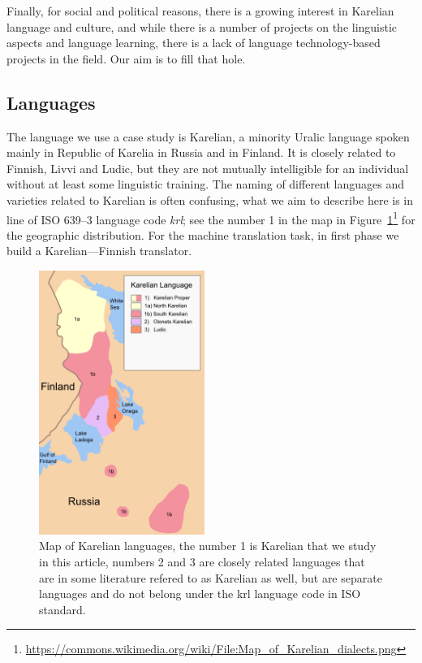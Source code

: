 \documentclass{flammie}
\begin{document}
Finally, for social and political reasons, there is a growing interest in
Karelian language and culture, and while there is a number of projects on
the linguistic aspects and language learning, there is a lack of
language technology-based projects in the field. Our aim is to fill that
hole.


\subsection{Languages}

The language we use a case study is Karelian, a minority Uralic language spoken
mainly in Republic of Karelia in Russia and in Finland. It is closely related
to Finnish, Livvi and Ludic, but they are not mutually intelligible for an
individual without at least some linguistic training. The naming of different
languages and varieties related to Karelian is often confusing, what we aim to
describe here is in line of ISO 639--3 language code \textit{krl}; see the
number 1 in the map in
Figure~\ref{fig:krl-map}\footnote{\url{https://commons.wikimedia.org/wiki/File:Map_of_Karelian_dialects.png}}
for the geographic distribution. For the machine translation task, in first
phase we build a Karelian---Finnish translator.

\begin{figure}
    \includegraphics[width=0.48\textwidth]{Map_of_Karelian_dialects.png}
    \caption{Map of Karelian languages, the number 1 is Karelian that
    we study in this article, numbers 2 and 3 are closely related languages
    that are in some literature refered to as Karelian as well, but are
    separate languages and do not belong under the krl language code in
    ISO standard.\label{fig:krl-map}}
\end{figure}
\end{document}
